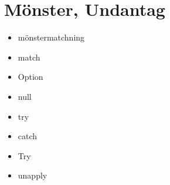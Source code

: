\chapter{Mönster, Undantag}\label{chapter:W08}
\begin{multicols}{2}\begin{itemize}[nosep,label={$\square$}]
\item mönstermatchning
\item match
\item Option
\item null
\item try
\item catch
\item Try
\item unapply\end{itemize}\end{multicols}
